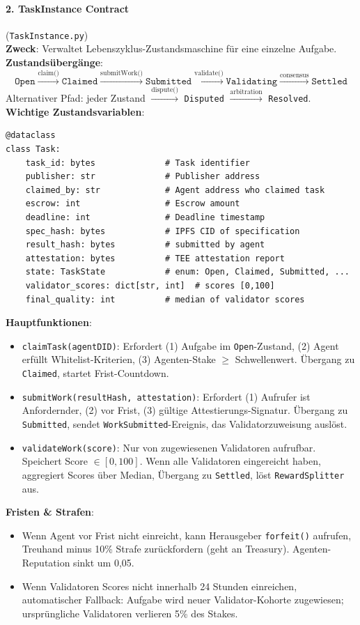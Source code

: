 \documentclass[11pt]{article}
\begin{document}
\paragraph{2. TaskInstance Contract} (\texttt{TaskInstance.py})\\
\textbf{Zweck}: Verwaltet Lebenszyklus-Zustandsmaschine für eine einzelne Aufgabe.\\
\textbf{Zustandsübergänge}:
\begin{equation}
\texttt{Open} \xrightarrow{\text{claim()}} \texttt{Claimed} \xrightarrow{\text{submitWork()}} \texttt{Submitted} \xrightarrow{\text{validate()}} \texttt{Validating} \xrightarrow{\text{consensus}} \texttt{Settled}
\end{equation}
Alternativer Pfad: jeder Zustand $\xrightarrow{\text{dispute()}}$ \texttt{Disputed} $\xrightarrow{\text{arbitration}}$ \texttt{Resolved}.\\
\textbf{Wichtige Zustandsvariablen}:
\begin{verbatim}
@dataclass
class Task:
    task_id: bytes              # Task identifier
    publisher: str              # Publisher address
    claimed_by: str             # Agent address who claimed task
    escrow: int                 # Escrow amount
    deadline: int               # Deadline timestamp
    spec_hash: bytes            # IPFS CID of specification
    result_hash: bytes          # submitted by agent
    attestation: bytes          # TEE attestation report
    state: TaskState            # enum: Open, Claimed, Submitted, ...
    validator_scores: dict[str, int]  # scores [0,100]
    final_quality: int          # median of validator scores
\end{verbatim}
\textbf{Hauptfunktionen}:
\begin{itemize}[noitemsep]
  \item \texttt{claimTask(agentDID)}: Erfordert (1) Aufgabe im \texttt{Open}-Zustand, (2) Agent erfüllt Whitelist-Kriterien, (3) Agenten-Stake $\geq$ Schwellenwert. Übergang zu \texttt{Claimed}, startet Frist-Countdown.
  \item \texttt{submitWork(resultHash, attestation)}: Erfordert (1) Aufrufer ist Anfordernder, (2) vor Frist, (3) gültige Attestierungs-Signatur. Übergang zu \texttt{Submitted}, sendet \texttt{WorkSubmitted}-Ereignis, das Validatorzuweisung auslöst.
  \item \texttt{validateWork(score)}: Nur von zugewiesenen Validatoren aufrufbar. Speichert Score $\in [0,100]$. Wenn alle Validatoren eingereicht haben, aggregiert Scores über Median, Übergang zu \texttt{Settled}, löst \texttt{RewardSplitter} aus.
\end{itemize}
\textbf{Fristen \& Strafen}:
\begin{itemize}[noitemsep]
  \item Wenn Agent vor Frist nicht einreicht, kann Herausgeber \texttt{forfeit()} aufrufen, Treuhand minus 10\% Strafe zurückfordern (geht an Treasury). Agenten-Reputation sinkt um 0,05.
  \item Wenn Validatoren Scores nicht innerhalb 24 Stunden einreichen, automatischer Fallback: Aufgabe wird neuer Validator-Kohorte zugewiesen; ursprüngliche Validatoren verlieren 5\% des Stakes.
\end{itemize}
\end{document}
